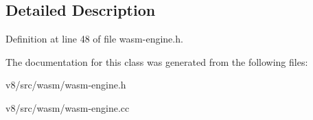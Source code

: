 \subsection{Detailed Description}


Definition at line 48 of file wasm-\/engine.\+h.



The documentation for this class was generated from the following files\+:\begin{DoxyCompactItemize}
\item 
v8/src/wasm/wasm-\/engine.\+h\item 
v8/src/wasm/wasm-\/engine.\+cc\end{DoxyCompactItemize}
